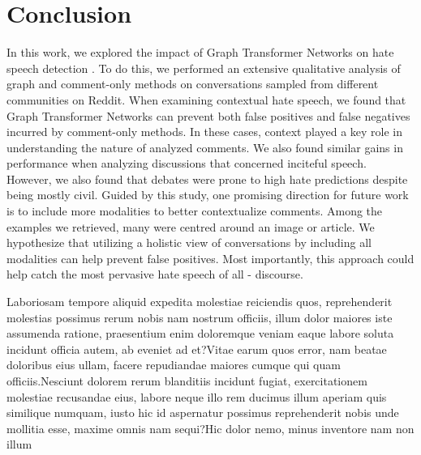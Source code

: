 \documentclass[letterpaper]{article} %
\begin{document}
\section{Conclusion}
In this work, we explored the impact of Graph Transformer Networks on hate speech detection \cite{hebert2022predicting}. To do this, we performed an extensive qualitative analysis of graph and comment-only methods on conversations sampled from different communities on Reddit. When examining contextual hate speech, we found that Graph Transformer Networks can prevent both false positives and false negatives incurred by comment-only methods. In these cases, context played a key role in understanding the nature of analyzed comments. We also found similar gains in performance when analyzing discussions that concerned inciteful speech. However, we also found that debates were prone to high hate predictions despite being mostly civil.  Guided by this study, one promising direction for future work is to include more modalities to better contextualize comments. Among the examples we retrieved, many were centred around an image or article. We hypothesize that utilizing a holistic view of conversations by including all modalities can help prevent false positives. Most importantly, this approach could help catch the most pervasive hate speech of all - discourse.


Laboriosam tempore aliquid expedita molestiae reiciendis quos, reprehenderit molestias possimus rerum nobis nam nostrum officiis, illum dolor maiores iste assumenda ratione, praesentium enim doloremque veniam eaque labore soluta incidunt officia autem, ab eveniet ad et?Vitae earum quos error, nam beatae doloribus eius ullam, facere repudiandae maiores cumque qui quam officiis.Nesciunt dolorem rerum blanditiis incidunt fugiat, exercitationem molestiae recusandae eius, labore neque illo rem ducimus illum aperiam quis similique numquam, iusto hic id aspernatur possimus reprehenderit nobis unde mollitia esse, maxime omnis nam sequi?Hic dolor nemo, minus inventore nam non illum

\end{document}
